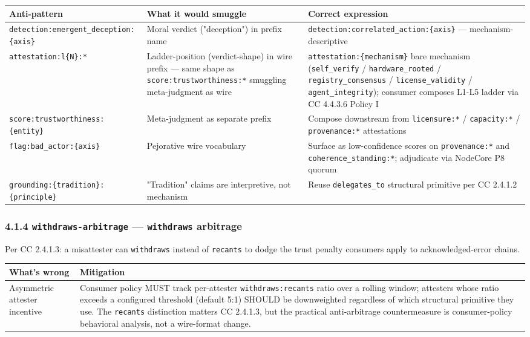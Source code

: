 \documentclass[11pt]{article}
\begin{document}
{\footnotesize
\begin{longtable}{|p{5.33cm}|p{5.33cm}|p{5.33cm}|}\hline
\textbf{Anti-pattern} & \textbf{What it would smuggle} & \textbf{Correct expression} \\ \hline\endhead
\texttt{detection:emergent\_deception:\{axis\}} & Moral verdict ("deception") in prefix name & \texttt{detection:correlated\_action:\{axis\}} — mechanism-descriptive \\ \hline
\texttt{attestation:l\{N\}:*} & Ladder-position (verdict-shape) in wire prefix — same shape as \texttt{score:trustworthiness:*} smuggling meta-judgment as wire & \texttt{attestation:\{mechanism\}} bare mechanism (\texttt{self\_verify} / \texttt{hardware\_rooted} / \texttt{registry\_consensus} / \texttt{license\_validity} / \texttt{agent\_integrity}); consumer composes L1-L5 ladder via CC 4.4.3.6 Policy I \\ \hline
\texttt{score:trustworthiness:\{entity\}} & Meta-judgment as separate prefix & Compose downstream from \texttt{licensure:*} / \texttt{capacity:*} / \texttt{provenance:*} attestations \\ \hline
\texttt{flag:bad\_actor:\{axis\}} & Pejorative wire vocabulary & Surface as low-confidence scores on \texttt{provenance:*} and \texttt{coherence\_standing:*}; adjudicate via NodeCore P8 quorum \\ \hline
\texttt{grounding:\{tradition\}:\{principle\}} & "Tradition" claims are interpretive, not mechanism & Reuse \texttt{delegates\_to} structural primitive per CC 2.4.1.2 \\ \hline
\end{longtable}}


\subsubsection*{4.1.4 \texttt{withdraws-arbitrage} — \texttt{withdraws} arbitrage}


Per CC 2.4.1.3: a misattester can \texttt{withdraws} instead of \texttt{recants} to dodge the trust penalty consumers apply to acknowledged-error chains.


{\footnotesize
\begin{longtable}{|p{8.0cm}|p{8.0cm}|}\hline
\textbf{What's wrong} & \textbf{Mitigation} \\ \hline\endhead
Asymmetric attester incentive & Consumer policy MUST track per-attester \texttt{withdraws:recants} ratio over a rolling window; attesters whose ratio exceeds a configured threshold (default 5:1) SHOULD be downweighted regardless of which structural primitive they use. The \texttt{recants} distinction matters CC 2.4.1.3, but the practical anti-arbitrage countermeasure is consumer-policy behavioral analysis, not a wire-format change. \\ \hline
\end{longtable}}
\end{document}
